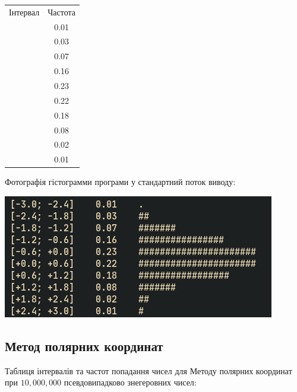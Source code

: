 \documentclass[a4paper,12pt]{report}
\begin{document}
\begin{table}[ht]
\centering %
\begin{tabular}{c c} %
  Інтервал & Частота \\\relax
[-3.0; -2.4] & 0.01 \\\relax
[-2.4; -1.8] & 0.03  \\\relax
[-1.8; -1.2] & 0.07 \\\relax
[-1.2; -0.6] & 0.16 \\\relax
[-0.6; +0.0] & 0.23 \\\relax
[+0.0; +0.6] & 0.22 \\\relax
[+0.6; +1.2] & 0.18 \\\relax
[+1.2; +1.8] & 0.08 \\\relax
[+1.8; +2.4] & 0.02 \\\relax
[+2.4; +3.0] & 0.01
\end{tabular}
\end{table}
Фотографія гістограмми програми у стандартний поток виводу:
\begin{center}\includegraphics[scale=0.5]{sigma}\end{center}

\subsection{Метод полярних координат}
Таблиця інтервалів та частот попадання чисел для Методу полярних координат при $10,000,000$ псевдовипадково знегеровних чисел:
\end{document}
